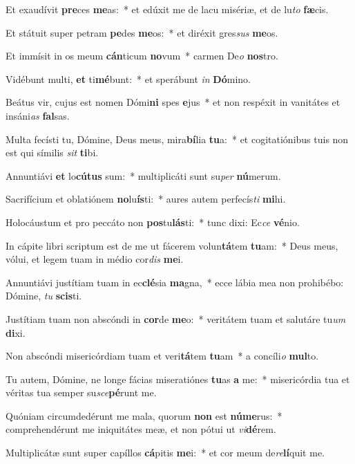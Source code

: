 \item Et exaudívit \textbf{pre}ces \textbf{me}as:~* et edúxit me de lacu misériæ, et de lu\textit{to} \textbf{fæ}cis.
\item Et státuit super petram \textbf{pe}des \textbf{me}os:~* et diréxit gres\textit{sus} \textbf{me}os.
\item Et immísit in os meum \textbf{cán}ticum \textbf{no}vum~* carmen De\textit{o} \textbf{nos}tro.
\item Vidébunt multi, \textbf{et} ti\textbf{mé}bunt:~* et sperábunt \textit{in} \textbf{Dó}mino.
\item Beátus vir, cujus est nomen Dómi\textbf{ni} spes \textbf{e}jus~* et non respéxit in vanitátes et insáni\textit{as} \textbf{fal}sas.
\item Multa fecísti tu, Dómine, Deus meus, mira\textbf{bí}lia \textbf{tu}a:~* et cogitatiónibus tuis non est qui símilis \textit{sit} \textbf{ti}bi.
\item Annuntiávi \textbf{et} lo\textbf{cú}\textbf{tus} sum:~* multiplicáti sunt su\textit{per} \textbf{nú}merum.
\item Sacrifícium et oblatiónem \textbf{no}lu\textbf{ís}ti:~* aures autem perfecís\textit{ti} \textbf{mi}hi.
\item Holocáustum et pro peccáto non \textbf{pos}tu\textbf{lás}ti:~* tunc dixi: Ec\textit{ce} \textbf{vé}nio.
\item In cápite libri scriptum est de me ut fácerem volun\textbf{tá}tem \textbf{tu}am:~* Deus meus, vólui, et legem tuam in médio cor\textit{dis} \textbf{me}i.
\item Annuntiávi justítiam tuam in ec\textbf{clé}sia \textbf{ma}gna,~* ecce lábia mea non prohibébo: Dómine, \textit{tu} \textbf{scis}ti.
\item Justítiam tuam non abscóndi in \textbf{cor}de \textbf{me}o:~* veritátem tuam et salutáre tu\textit{um} \textbf{di}xi.
\item Non abscóndi misericórdiam tuam et veri\textbf{tá}tem \textbf{tu}am~* a concíli\textit{o} \textbf{mul}to.
\item Tu autem, Dómine, ne longe fácias miseratiónes \textbf{tu}as \textbf{a} me:~* misericórdia tua et véritas tua semper su\textit{sce}\textbf{pé}runt me.
\item Quóniam circumdedérunt me mala, quorum \textbf{non} est \textbf{nú}\textbf{me}rus:~* comprehendérunt me iniquitátes meæ, et non pótui ut \textit{vi}\textbf{dé}rem.
\item Multiplicátæ sunt super capíllos \textbf{cá}pitis \textbf{me}i:~* et cor meum de\textit{re}\textbf{lí}quit me.
